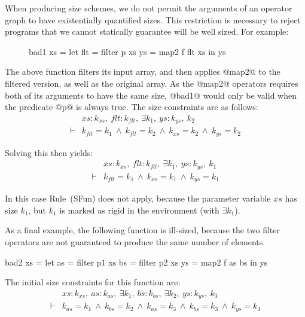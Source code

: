 When producing size schemes, we do not permit the arguments of an operator graph to have existentially quantified sizes. This restriction is necessary to reject programs that we cannot statically guarantee will be well sized. For example:
\begin{figure}[H]
\begin{code}
    bad1 xs  = let flt   = filter p xs
                   ys    = map2   f flt xs
               in  ys
\end{code}
\end{figure}
The above function filters its input array, and then applies @map2@ to the filtered version, as well as the original array. As the @map2@ operators requires both of its arguments to have the same size, @bad1@ would only be valid when the predicate @p@ is always true. The size constraints are as follows:
$$
\begin{array}{ll}
       & xs : k_{xs},~ flt : k_{flt},~ \exists k_1,~ ys : k_{ys},~ k_2
\\
\vdash &          k_{flt}  = k_1
        ~\wedge~  k_{flt}  = k_2
        ~\wedge~  k_{xs}   = k_2
        ~\wedge~  k_{ys}   = k_2
\end{array}
$$

\noindent
Solving this then yields:
$$
\begin{array}{ll}
       & xs : k_{xs},~ flt : k_{flt},~ \exists k_1,~ ys : k_{ys},~ k_1
\\
\vdash &          k_{flt}  = k_1
        ~\wedge~  k_{xs}   = k_1
        ~\wedge~  k_{ys}   = k_1
\end{array}
$$

In this case Rule~(SFun) does not apply, because the parameter variable $xs$ has size $k_1$, but $k_1$ is marked as rigid in the environment (with $\exists k_1$). 

As a final example, the following function is ill-sized, because the two filter operators are not guaranteed to produce the same number of elements.
\begin{code}
     bad2 xs = let as  = filter p1 xs
                   bs  = filter p2 xs
                   ys  = map2   f  as bs
               in  ys
\end{code}

The initial size constraints for this function are:
$$
\begin{array}{ll}
       & xs : k_{xs},~ as : k_{as},~ \exists k_1,~ bs : k_{bs},~ \exists k_2,~ ys : k_{ys},~ k_3
\\
\vdash &          k_{as}   = k_1
        ~\wedge~  k_{bs}   = k_2
        ~\wedge~  k_{as}   = k_3
        ~\wedge~  k_{bs}   = k_3
        ~\wedge~  k_{ys}   = k_3
\end{array}
$$

